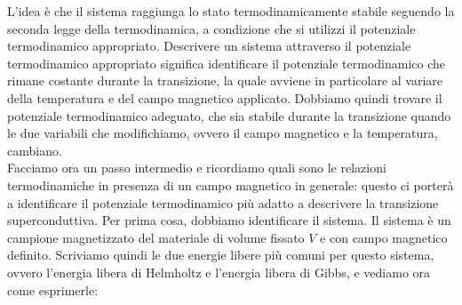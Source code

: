 L'idea è che il sistema raggiunga lo stato termodinamicamente stabile seguendo la seconda legge della termodinamica, a condizione che si utilizzi il potenziale termodinamico appropriato. Descrivere un sistema attraverso il potenziale termodinamico appropriato significa identificare il potenziale termodinamico che rimane costante durante la transizione, la quale avviene in particolare al variare della temperatura e del campo magnetico applicato. Dobbiamo quindi trovare il potenziale termodinamico adeguato, che sia stabile durante la transizione quando le due variabili che modifichiamo, ovvero il campo magnetico e la temperatura, cambiano.\\
Facciamo ora un passo intermedio e ricordiamo quali sono le relazioni termodinamiche in presenza di un campo magnetico in generale: questo ci porterà a identificare il potenziale termodinamico più adatto a descrivere la transizione superconduttiva. Per prima cosa, dobbiamo identificare il sistema. Il sistema è un campione magnetizzato del materiale di volume fissato $V$ e con campo magnetico definito. Scriviamo quindi le due energie libere più comuni per questo sistema, ovvero l'energia libera di Helmholtz e l'energia libera di Gibbs, e vediamo ora come esprimerle:
